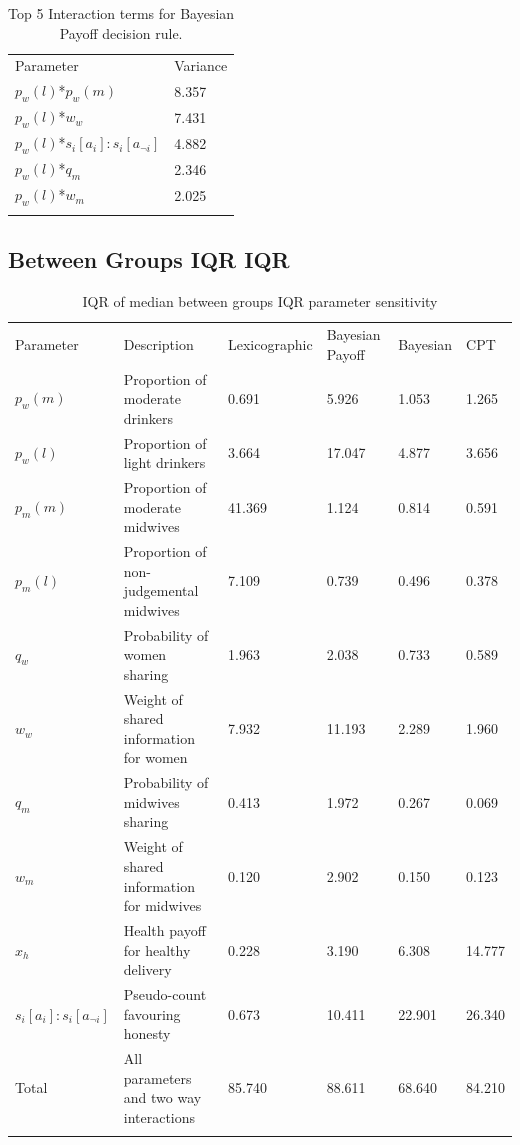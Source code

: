 \documentclass[graybox]{svmult}
\begin{document}
\begin{table}[H]
\caption{Top 5 Interaction terms for Bayesian Payoff decision rule. \label{tab:sa_interaction_payoff_sig_iqr}}
\begin{tabular} {ll}
\hline\noalign{\smallskip}
Parameter & Variance \\
\noalign{\smallskip}\svhline\noalign{\smallskip}
\(p_{w}(l)\)*\(p_{w}(m)\) & 8.357\\
\(p_{w}(l)\)*\(w_{w}\) & 7.431\\
\(p_{w}(l)\)*\(s_{i}[a_{i}]:s_{i}[a_{\neg i}]\) & 4.882\\
\(p_{w}(l)\)*\(q_{m}\) & 2.346\\
\(p_{w}(l)\)*\(w_{m}\) & 2.025\\ 
\noalign{\smallskip}\hline\noalign{\smallskip}
\end{tabular}
\end{table}

 
\subsection{Between Groups IQR IQR}

\begin{table}[H]
\caption{IQR of median between groups IQR parameter sensitivity \label{tab:sa_results_iqr_iqr}}
\begin{tabular} {llllll}
\hline\noalign{\smallskip}
Parameter & Description & Lexicographic & Bayesian Payoff & Bayesian & \ac{CPT} \\
\noalign{\smallskip}\svhline\noalign{\smallskip}
\(p_{w}(m)\) & Proportion of moderate drinkers & 0.691 & 5.926 & 1.053 & 1.265 \\
\(p_{w}(l)\) & Proportion of light drinkers & 3.664 & 17.047 & 4.877 & 3.656 \\
\(p_{m}(m)\) & Proportion of moderate midwives & 41.369 & 1.124 & 0.814 & 0.591 \\
\(p_{m}(l)\) & Proportion of non-judgemental midwives & 7.109 & 0.739 & 0.496 & 0.378 \\
\(q_{w}\) & Probability of women sharing & 1.963 & 2.038 & 0.733 & 0.589 \\
\(w_{w}\) & Weight of shared information for women & 7.932 & 11.193 & 2.289 & 1.960 \\
\(q_{m}\) & Probability of midwives sharing & 0.413 & 1.972 & 0.267 & 0.069\\
\(w_{m}\) & Weight of shared information for midwives & 0.120 & 2.902 & 0.150 & 0.123 \\
\(x_{h}\) & Health payoff for healthy delivery & 0.228 & 3.190 & 6.308 & 14.777 \\
\(s_{i}[a_{i}]:s_{i}[a_{\neg i}]\) & Pseudo-count favouring honesty & 0.673 & 10.411 & 22.901 & 26.340 \\
Total & All parameters and two way interactions & 85.740 & 88.611 & 68.640 & 84.210 \\
\noalign{\smallskip}\hline\noalign{\smallskip}
\end{tabular}
\end{table}
\end{document}
